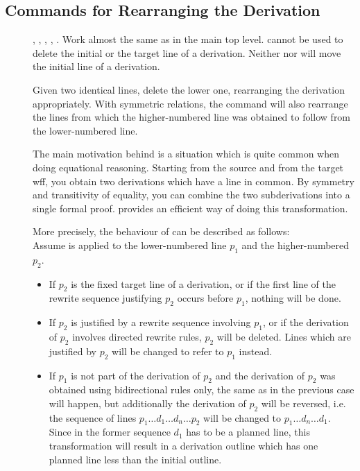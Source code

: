 \subsection{Commands for Rearranging the Derivation}
  \begin{description}
  \item[] , ,
    , , .
    Work almost the same as in the main top level. 
    cannot be used to delete the initial or the target line of a derivation.
    Neither  nor  will move the
    initial line of a derivation.
  \item[]  Given two identical lines, delete the lower
    one, rearranging the derivation appropriately. With symmetric relations,
    the command will also rearrange the lines from which the higher-numbered
    line was obtained to follow from the lower-numbered line.

    The main motivation behind  is a situation which is
    quite common when doing equational reasoning. Starting from the source and
    from the target wff, you obtain two derivations which have a line in
    common. By symmetry and transitivity of equality, you can combine the
    two subderivations into a single formal proof. 
    provides an efficient way of doing this transformation.

    More precisely, the behaviour of  can be described
    as follows:\\
    Assume  is applied to the lower-numbered line $p_1$
    and the higher-numbered $p_2$.
    \begin{itemize}
    \item If $p_2$ is the fixed target line of a derivation, or if the first
      line of the rewrite sequence justifying $p_2$ occurs before $p_1$,
      nothing will be done.
    \item If $p_2$ is justified by a rewrite sequence involving $p_1$, or if
      the derivation of $p_2$ involves directed rewrite rules, $p_2$ will be
      deleted. Lines which are justified by $p_2$ will be changed to refer to
      $p_1$ instead.
    \item If $p_1$ is not part of the derivation of $p_2$ and the derivation of
      $p_2$ was obtained using bidirectional rules only, the same as in the
      previous case will happen, but additionally the derivation of $p_2$ will
      be reversed, i.e. the sequence of lines $p_1\ldots d_1\ldots d_n\ldots
      p_2$ will be changed to $p_1\ldots d_n\ldots d_1$. Since in the former
      sequence $d_1$ has to be a planned line, this transformation will result
      in a derivation outline which has one planned line less than the initial
      outline.
    \end{itemize}
  \end{description}

